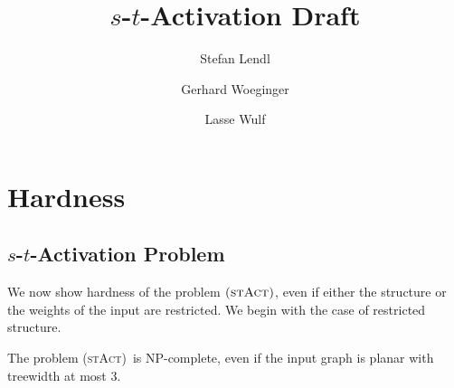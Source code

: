 \documentclass[runningheads]{llncs}
\numberwithin{equation}{section}
\newcommand{\stact}{\textsc{(stAct)}}
\begin{document}
\title{$s$-$t$-Activation Draft}
%
%
\author{Stefan Lendl \and
Gerhard Woeginger \and
Lasse Wulf}
%
%
%
\maketitle              %
%
\section{Hardness}
\subsection{$s$-$t$-Activation Problem}
We now show hardness of the problem $\stact$, even if either the structure or the weights of the input are restricted. We begin with the case of restricted structure.

\begin{theorem}
\label{thm_stact_np_hard}
The problem \stact\ is NP-complete, even if the input graph is planar with treewidth at most 3.
\end{theorem}
\end{document}
